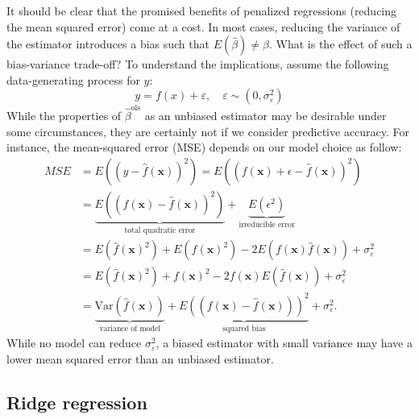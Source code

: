 \documentclass[
]{book}
\begin{document}
It should be clear that the promised benefits of penalized regressions (reducing the mean squared error) come at a cost. In most cases, reducing the variance of the estimator introduces a bias such that \(E\left(\hat\beta\right) \neq \beta\). What is the effect of such a bias-variance trade-off? To understand the implications, assume the following data-generating process for \(y\): \[y = f(x) + \varepsilon, \quad \varepsilon \sim (0, \sigma_\varepsilon^2)\] While the properties of \(\hat\beta^\text{ols}\) as an unbiased estimator may be desirable under some circumstances, they are certainly not if we consider predictive accuracy. For instance, the mean-squared error (MSE) depends on our model choice as follow: \[\begin{aligned}
MSE &=E((y-\hat{f}(\textbf{x}))^2)=E((f(\textbf{x})+\epsilon-\hat{f}(\textbf{x}))^2)\\
&= \underbrace{E((f(\textbf{x})-\hat{f}(\textbf{x}))^2)}_{\text{total quadratic error}}+\underbrace{E(\epsilon^2)}_{\text{irreducible error}} \\
&= E\left(\hat{f}(\textbf{x})^2\right)+E\left(f(\textbf{x})^2\right)-2E\left(f(\textbf{x})\hat{f}(\textbf{x})\right)+\sigma_\varepsilon^2\\
&=E\left(\hat{f}(\textbf{x})^2\right)+f(\textbf{x})^2-2f(\textbf{x})E\left(\hat{f}(\textbf{x})\right)+\sigma_\varepsilon^2\\
&=\underbrace{\text{Var}\left(\hat{f}(\textbf{x})\right)}_{\text{variance of model}}+ \underbrace{E\left((f(\textbf{x})-\hat{f}(\textbf{x}))\right)^2}_{\text{squared bias}} +\sigma_\varepsilon^2. 
\end{aligned}\] While no model can reduce \(\sigma_\varepsilon^2\), a biased estimator with small variance may have a lower mean squared error than an unbiased estimator.

\hypertarget{ridge-regression}{%
\subsection{Ridge regression}\label{ridge-regression}}
\end{document}
